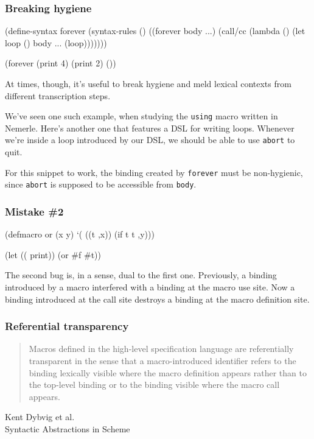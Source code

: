 \documentclass[hyperref={bookmarks=false}]{beamer}
\begin{document}
\begin{frame}[fragile]
\frametitle{Breaking hygiene}

\begin{lstlistinglike}
\begin{semiverbatim}
(define-syntax forever
  (syntax-rules ()
    ((forever body ...)
     (call/cc (lambda (\text{\color{red}{abort}})
                (let loop () body ... (loop)))))))

(forever (print 4) (print 2) (\text{\color{blue}{abort}}))
\end{semiverbatim}
\end{lstlistinglike}

At times, though, it's useful to break hygiene and meld lexical contexts
from different transcription steps.

We've seen one such example, when studying the \texttt{using} macro written in Nemerle.
Here's another one that features a DSL for writing loops. Whenever we're inside a loop
introduced by our DSL, we should be able to use \texttt{abort} to quit.

For this snippet to work, the binding created by \texttt{forever} must be non-hygienic,
since \texttt{abort} is supposed to be accessible from \texttt{body}.
\end{frame}

\begin{frame}[fragile]
\frametitle{Mistake \#2}

\begin{lstlistinglike}
\begin{semiverbatim}
(defmacro or (x y)
  `(\text{\color{red}{let}} ((t ,x))
     (if t t ,y)))

(let ((\text{\color{blue}{let}} print))
  (or \#f \#t))
\end{semiverbatim}
\end{lstlistinglike}

The second bug is, in a sense, dual to the first one. Previously, a binding introduced by a macro
interfered with a binding at the macro use site. Now a binding introduced at the call site destroys
a binding at the macro definition site.
\end{frame}

\begin{frame}[fragile]
\frametitle{Referential transparency}

\begin{quote}
Macros defined in the high-level specification language are referentially
transparent in the sense that a macro-introduced identifier refers to the
binding lexically visible where the macro definition appears rather than to
the top-level binding or to the binding visible where the macro call appears.
\end{quote}

\begin{flushright}
\textemdash Kent Dybvig et al.\\
Syntactic Abstractions in Scheme
\end{flushright}
\end{frame}
\end{document}
